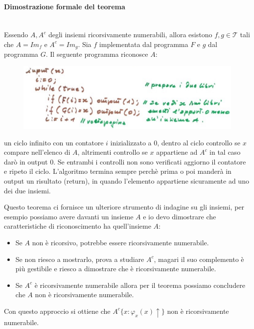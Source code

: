 \documentclass{article}
\begin{document}
\paragraph{Dimostrazione formale del teorema}\mbox{}\\
Essendo $A,A^c$ degli insiemi ricorsivamente numerabili, allora
esistono $f,g\in\mathcal{T}$ tali che $A=Im_f$ e $A^c=Im_g$. Sia $f$ implementata
dal programma $F$ e $g$ dal programma $G$. Il seguente programma riconosce $A$:
\begin{figure}[H]
    \centering
    \includegraphics[scale=0.5]{images/prog_per_a.png}
\end{figure}
un ciclo infinito con un contatore $i$ inizializzato a 0, dentro al ciclo controllo
se $x$ compare nell'elenco di $A$, altrimenti controllo se $x$ appartiene ad $A^c$
in tal caso darò in output 0. Se entrambi i controlli non sono verificati
aggiorno il contatore e ripeto il ciclo.
L'algoritmo termina sempre perchè prima o poi manderà in output un risultato (return),
in quando l'elemento appartiene sicuramente ad uno dei due insiemi.

Questo teorema ci fornisce un ulteriore strumento di indagine su gli insiemi, per esempio
possiamo avere davanti un insieme $A$ e io devo dimostrare che caratteristiche
di riconoscimento ha quell'insieme $A$:
\begin{itemize}
    \item Se $A$ non è ricorsivo, potrebbe essere ricorsivamente numerabile.
    \item Se non riesco a mostrarlo, prova a studiare $A^c$, magari il suo complemento
    è più gestibile e riesco a dimostrare che è ricorsivamente numerabile.
    \item Se $A^c$ è ricorsivamente numerabile allora per il teorema possiamo concludere che
    $A$ non è ricorsivamente numerabile.
\end{itemize}
Con questo approccio si ottiene che $A^c\{x:\varphi_x(x)\uparrow\}$ non è ricorsivamente
numerabile.
\end{document}
